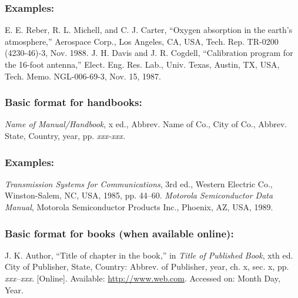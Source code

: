 \documentclass{IEEEoj}
\begin{document}
\subsubsection*{Examples:}

\begin{thebibliography}{00}
 E. E. Reber, R. L. Michell, and C. J. Carter, ``Oxygen absorption in the earth's atmosphere,'' Aerospace Corp., Los Angeles, CA, USA, Tech. Rep. TR-0200 (4230-46)-3, Nov. 1988.
 J. H. Davis and J. R. Cogdell, ``Calibration program for the 16-foot antenna,'' Elect. Eng. Res. Lab., Univ. Texas, Austin, TX, USA, Tech. Memo. NGL-006-69-3, Nov. 15, 1987.
\end{thebibliography}

\subsubsection*{Basic format for handbooks:}

\begin{thebibliography}{00}
 \textit{Name of Manual/Handbook}, x ed., Abbrev. Name of Co., City of Co., Abbrev. State, Country, year, pp.
\textit{xxx-xxx.}
\end{thebibliography}

\subsubsection*{Examples:}

\begin{thebibliography}{00}
 \textit{Transmission Systems for Communications}, 3rd ed., Western Electric Co., Winston-Salem, NC, USA, 1985, pp. 44--60.
 \textit{Motorola Semiconductor Data Manual}, Motorola Semiconductor Products Inc., Phoenix, AZ, USA, 1989.
\end{thebibliography}

\subsubsection*{Basic format for books (when available online): }

\begin{thebibliography}{00}
 J. K. Author, ``Title of chapter in the book,'' in \textit{Title of Published Book}, xth ed. City of
Publisher, State, Country: Abbrev. of Publisher, year, ch. x, sec. x, pp.
\textit{xxx--xxx}. [Online]. Available: \underline {http://www.web.com}. Accessed on: Month
Day, Year.
\end{thebibliography}
\end{document}

